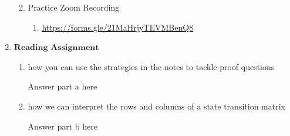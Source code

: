 \documentclass[11pt]{article}
\begin{document}
\begin{enumerate}
\begin{enumerate}
\begin{enumerate}
\begin{Answer}
               \end{Answer}
             \end{enumerate}
             \item Practice Zoom Recording 
             \begin{enumerate}
               \item \href{https://forms.gle/21MaHrjyTEVMBenQ8}{https://forms.gle/21MaHrjyTEVMBenQ8}
               \begin{Answer}
               \end{Answer}
             \end{enumerate}
           \end{enumerate}
    
   \newpage
   \item $\textbf{Reading Assignment}$
       \begin{enumerate}
           \item how you can use the strategies in the notes to tackle proof questions
           \begin{Answer}
                Answer part a here
            \end{Answer}
           \item how we can interpret the rows and columns of a state transition matrix
           \begin{Answer}
                Answer part b here
           \end{Answer}
       \end{enumerate}
       

\end{enumerate}
\end{document}
